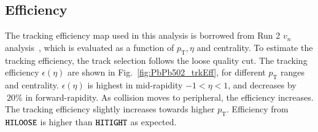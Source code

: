 \subsection{Efficiency}
The tracking efficiency map used in this analysis is borrowed from Run 2 $v_n$ analysis~\cite{Burka:2151932}, which is evaluated as a function of $p_{\text{T}}, \eta$ and centrality. To estimate the tracking efficiency, the track selection follows the loose quality cut. The tracking efficiency $\epsilon(\eta)$ are shown in Fig.~\ref{fig:PbPb502_trkEff}, for different $p_{\text{T}}$ ranges and centrality. $\epsilon(\eta)$ is highest in mid-rapidity $-1<\eta<1$, and decreases by $~20\%$ in forward-rapidity. As collision moves to peripheral, the efficiency increases. The tracking efficiency slightly increases towards higher $p_{\text{T}}$. Efficiency from $\verb|HILOOSE|$ is higher than $\verb|HITIGHT|$ as expected.

